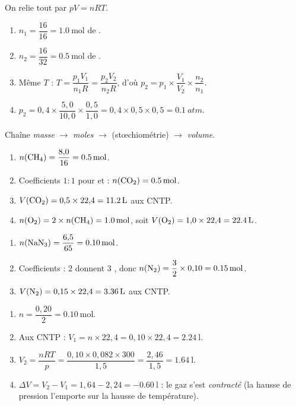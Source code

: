 \documentclass[11pt,a4paper]{article}
\begin{document}
\begin{corrige}
On relie tout par $pV=nRT$.
\begin{enumerate}[label=\alph*)]
  \item $n_1=\dfrac{16}{16}=\qty{1.0}{\mole}$ de .
  \item $n_2=\dfrac{16}{32}=\qty{0.5}{\mole}$ de .
  \item Même $T$ : $T=\dfrac{p_1 V_1}{n_1 R}=\dfrac{p_2 V_2}{n_2 R}$, d'où
        $p_2=p_1\times\dfrac{V_1}{V_2}\times\dfrac{n_2}{n_1}$.
  \item $p_2=0{,}4\times\dfrac{5{,}0}{10{,}0}\times\dfrac{0{,}5}{1{,}0}=0{,}4\times0{,}5\times0{,}5
        =\qty{0.1}{atm}$.
\end{enumerate}
\end{corrige}

\begin{corrige}
Chaîne \emph{masse} $\to$ \emph{moles} $\to$ (stœchiométrie) $\to$ \emph{volume}.
\begin{enumerate}[label=\alph*)]
  \item $n(\ce{CH4})=\dfrac{8{,}0}{16}=\qty{0.5}{\mole}$.
  \item Coefficients $1:1$ pour  et  : $n(\ce{CO2})=\qty{0.5}{\mole}$.
  \item $V(\ce{CO2})=0{,}5\times22{,}4=\qty{11.2}{\litre}$ aux CNTP.
  \item $n(\ce{O2})=2\times n(\ce{CH4})=\qty{1.0}{\mole}$, soit $V(\ce{O2})=1{,}0\times22{,}4=\qty{22.4}{\litre}$.
\end{enumerate}
\end{corrige}

\begin{corrige}
\begin{enumerate}[label=\alph*)]
  \item $n(\ce{NaN3})=\dfrac{6{,}5}{65}=\qty{0.10}{\mole}$.
  \item Coefficients : $2$  donnent $3$ , donc
        $n(\ce{N2})=\dfrac{3}{2}\times0{,}10=\qty{0.15}{\mole}$.
  \item $V(\ce{N2})=0{,}15\times22{,}4=\qty{3.36}{\litre}$ aux CNTP.
\end{enumerate}
\end{corrige}

\begin{corrige}
\begin{enumerate}[label=\alph*)]
  \item $n=\dfrac{0{,}20}{2}=\qty{0.10}{\mole}$.
  \item Aux CNTP : $V_1=n\times22{,}4=0{,}10\times22{,}4=\qty{2.24}{\litre}$.
  \item $V_2=\dfrac{nRT}{p}=\dfrac{0{,}10\times0{,}082\times300}{1{,}5}=\dfrac{2{,}46}{1{,}5}=\qty{1.64}{\litre}$.
  \item $\Delta V=V_2-V_1=1{,}64-2{,}24=\qty{-0.60}{\litre}$ : le gaz s'est \emph{contracté}
        (la hausse de pression l'emporte sur la hausse de température).
\end{enumerate}
\end{corrige}
\end{document}
